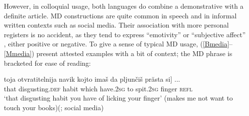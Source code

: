 \documentclass[output=paper]{langscibook}
\begin{document}
\ea \label{Mperson}


\z
\z

\noindent However, in colloquial usage, both languages do combine a demonstrative with a definite article. MD constructions are quite common in speech and in informal written contexts such as social media. Their association with more personal registers is no accident, as they tend to express ``emotivity'' or ``subjective affect'' \citep{Friedman2019}, either positive or negative. To give a sense of typical MD usage, (\ref{Bmedia}--\ref{Mmedia}) present attested examples with a bit of context; the MD phrase is bracketed for ease of reading:


\ea \label{Bmedia}
\ea \label{licking}
\gll \minsp{[} toja 	otvratitelnija navik kojto imaš 	da 	pljunčiš 	prăsta 	si] ...\\
{} that 	disgusting.\textsc{def} 	habit 	which 	have.\textsc{2sg} 	to 	spit.\textsc{2sg}	finger 	\textsc{refl} \\
\glt `that disgusting habit you have of licking your finger' (makes me not want to touch your books)\hfill (; social media)
\end{document}
